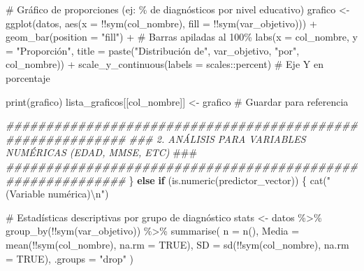 \documentclass[
  letterpaper,
  DIV=11,
  numbers=noendperiod]{scrartcl}
\newenvironment{Shaded}{\begin{snugshade}}{\end{snugshade}}
\newcommand{\AlertTok}[1]{\textcolor[rgb]{0.68,0.00,0.00}{#1}}
\newcommand{\AttributeTok}[1]{\textcolor[rgb]{0.40,0.45,0.13}{#1}}
\newcommand{\CommentTok}[1]{\textcolor[rgb]{0.37,0.37,0.37}{#1}}
\newcommand{\ConstantTok}[1]{\textcolor[rgb]{0.56,0.35,0.01}{#1}}
\newcommand{\ControlFlowTok}[1]{\textcolor[rgb]{0.00,0.23,0.31}{\textbf{#1}}}
\newcommand{\DocumentationTok}[1]{\textcolor[rgb]{0.37,0.37,0.37}{\textit{#1}}}
\newcommand{\FunctionTok}[1]{\textcolor[rgb]{0.28,0.35,0.67}{#1}}
\newcommand{\NormalTok}[1]{\textcolor[rgb]{0.00,0.23,0.31}{#1}}
\newcommand{\OtherTok}[1]{\textcolor[rgb]{0.00,0.23,0.31}{#1}}
\newcommand{\SpecialCharTok}[1]{\textcolor[rgb]{0.37,0.37,0.37}{#1}}
\newcommand{\StringTok}[1]{\textcolor[rgb]{0.13,0.47,0.30}{#1}}
\begin{document}
\begin{Shaded}
\begin{Highlighting}[]
      \CommentTok{\# Gráfico de proporciones (ej: \% de diagnósticos por nivel educativo)}
\NormalTok{      grafico }\OtherTok{\textless{}{-}} \FunctionTok{ggplot}\NormalTok{(datos, }\FunctionTok{aes}\NormalTok{(}\AttributeTok{x =} \SpecialCharTok{!!}\FunctionTok{sym}\NormalTok{(col\_nombre), }\AttributeTok{fill =} \SpecialCharTok{!!}\FunctionTok{sym}\NormalTok{(var\_objetivo))) }\SpecialCharTok{+}
        \FunctionTok{geom\_bar}\NormalTok{(}\AttributeTok{position =} \StringTok{"fill"}\NormalTok{) }\SpecialCharTok{+}  \CommentTok{\# Barras apiladas al 100\%}
        \FunctionTok{labs}\NormalTok{(}\AttributeTok{x =}\NormalTok{ col\_nombre, }\AttributeTok{y =} \StringTok{"Proporción"}\NormalTok{, }
             \AttributeTok{title =} \FunctionTok{paste}\NormalTok{(}\StringTok{"Distribución de"}\NormalTok{, var\_objetivo, }\StringTok{"por"}\NormalTok{, col\_nombre)) }\SpecialCharTok{+}
        \FunctionTok{scale\_y\_continuous}\NormalTok{(}\AttributeTok{labels =}\NormalTok{ scales}\SpecialCharTok{::}\NormalTok{percent)  }\CommentTok{\# Eje Y en porcentaje}
      
      \FunctionTok{print}\NormalTok{(grafico)}
\NormalTok{      lista\_graficos[[col\_nombre]] }\OtherTok{\textless{}{-}}\NormalTok{ grafico  }\CommentTok{\# Guardar para referencia}

    \DocumentationTok{\#\#\#\#\#\#\#\#\#\#\#\#\#\#\#\#\#\#\#\#\#\#\#\#\#\#\#\#\#\#\#\#\#\#\#\#\#\#\#\#\#\#\#\#\#\#\#\#\#\#\#\#\#\#\#\#\#\#\#}
    \DocumentationTok{\#\#\# 2. ANÁLISIS PARA VARIABLES NUMÉRICAS (EDAD, MMSE, ETC) }\AlertTok{\#\#\#}
    \DocumentationTok{\#\#\#\#\#\#\#\#\#\#\#\#\#\#\#\#\#\#\#\#\#\#\#\#\#\#\#\#\#\#\#\#\#\#\#\#\#\#\#\#\#\#\#\#\#\#\#\#\#\#\#\#\#\#\#\#\#\#\#}
\NormalTok{    \} }\ControlFlowTok{else} \ControlFlowTok{if}\NormalTok{ (}\FunctionTok{is.numeric}\NormalTok{(predictor\_vector)) \{}
      \FunctionTok{cat}\NormalTok{(}\StringTok{"(Variable numérica)}\SpecialCharTok{\textbackslash{}n}\StringTok{"}\NormalTok{)}
      
      \CommentTok{\# Estadísticas descriptivas por grupo de diagnóstico}
\NormalTok{      stats }\OtherTok{\textless{}{-}}\NormalTok{ datos }\SpecialCharTok{\%\textgreater{}\%}
        \FunctionTok{group\_by}\NormalTok{(}\SpecialCharTok{!!}\FunctionTok{sym}\NormalTok{(var\_objetivo)) }\SpecialCharTok{\%\textgreater{}\%}
        \FunctionTok{summarise}\NormalTok{(}
          \AttributeTok{n =} \FunctionTok{n}\NormalTok{(),}
          \AttributeTok{Media =} \FunctionTok{mean}\NormalTok{(}\SpecialCharTok{!!}\FunctionTok{sym}\NormalTok{(col\_nombre), }\AttributeTok{na.rm =} \ConstantTok{TRUE}\NormalTok{),}
          \AttributeTok{SD =} \FunctionTok{sd}\NormalTok{(}\SpecialCharTok{!!}\FunctionTok{sym}\NormalTok{(col\_nombre), }\AttributeTok{na.rm =} \ConstantTok{TRUE}\NormalTok{),}
          \AttributeTok{.groups =} \StringTok{"drop"}
\NormalTok{        )}
      

\end{Highlighting}
\end{Shaded}
\end{document}
